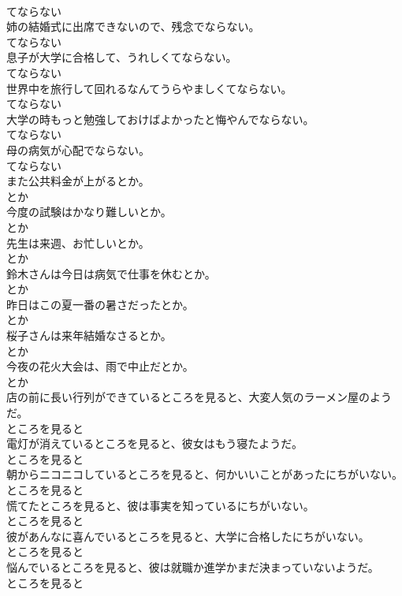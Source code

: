 \documentclass[8pt]{extreport}
\begin{document}
\begin{CJK}{UTF8}{min}
\\	てならない
\\	姉の結婚式に出席できないので、残念でならない。	
\\	てならない
\\	息子が大学に合格して、うれしくてならない。	
\\	てならない
\\	世界中を旅行して回れるなんてうらやましくてならない。	
\\	てならない
\\	大学の時もっと勉強しておけばよかったと悔やんでならない。	
\\	てならない
\\	母の病気が心配でならない。	
\\	てならない
\\	また公共料金が上がるとか。	
\\	とか
\\	今度の試験はかなり難しいとか。	
\\	とか
\\	先生は来週、お忙しいとか。	
\\	とか
\\	鈴木さんは今日は病気で仕事を休むとか。	
\\	とか
\\	昨日はこの夏一番の暑さだったとか。	
\\	とか
\\	桜子さんは来年結婚なさるとか。	
\\	とか
\\	今夜の花火大会は、雨で中止だとか。	
\\	とか
\\	店の前に長い行列ができているところを見ると、大変人気のラーメン屋のようだ。	
\\	ところを見ると
\\	電灯が消えているところを見ると、彼女はもう寝たようだ。	
\\	ところを見ると
\\	朝からニコニコしているところを見ると、何かいいことがあったにちがいない。	
\\	ところを見ると
\\	慌てたところを見ると、彼は事実を知っているにちがいない。	
\\	ところを見ると
\\	彼があんなに喜んでいるところを見ると、大学に合格したにちがいない。	
\\	ところを見ると
\\	悩んでいるところを見ると、彼は就職か進学かまだ決まっていないようだ。	
\\	ところを見ると

\end{CJK}
\end{document}
